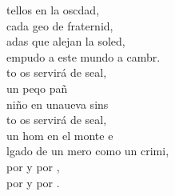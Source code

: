 \begin{cancion}
	tellos en la oscdad,\\
	cada geo de fraternid,\\
	adas que alejan la soled,\\
	empudo a este mundo a cambr.\\
	to os servirá de seal, \\
	un peqo pañ  \\
	niño en unaueva sins\\
	to os servirá de seal, \\
	un hom en el monte e \\
	lgado de un mero como un crimi,\\
	por  y por , \\
	por  y por .  \\
\end{cancion}%
